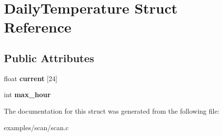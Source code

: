 \hypertarget{struct_daily_temperature}{}\section{Daily\+Temperature Struct Reference}
\label{struct_daily_temperature}
\subsection*{Public Attributes}
\begin{DoxyCompactItemize}
\item 
\hypertarget{struct_daily_temperature_ad129664cc1e823c635b79249b6490879}{}float {\bfseries current} \mbox{[}24\mbox{]}\label{struct_daily_temperature_ad129664cc1e823c635b79249b6490879}

\item 
\hypertarget{struct_daily_temperature_a41791e0a521137cad6dce7497e84f706}{}int {\bfseries max\+\_\+hour}\label{struct_daily_temperature_a41791e0a521137cad6dce7497e84f706}

\end{DoxyCompactItemize}


The documentation for this struct was generated from the following file\+:\begin{DoxyCompactItemize}
\item 
examples/scan/scan.\+c\end{DoxyCompactItemize}
